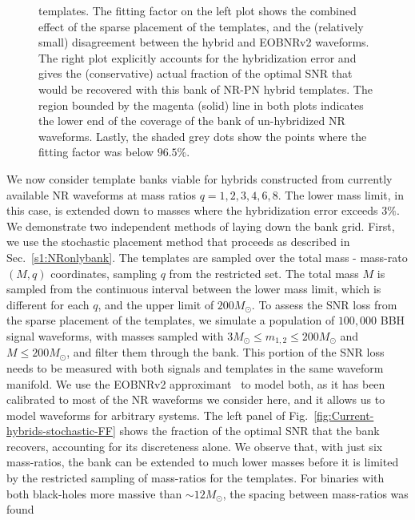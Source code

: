 \begin{figure}
\begin{center}
{  templates. The fitting factor on the left plot shows the combined effect of 
  the sparse placement of the templates, and the (relatively small) 
  disagreement between the hybrid and EOBNRv2 waveforms. The right plot
  explicitly accounts for the hybridization error and gives the (conservative)
  actual fraction of the optimal SNR that would be recovered
  with this bank of NR-PN hybrid templates. The region bounded by the magenta 
  (solid) line in both plots indicates the lower end of the coverage of the 
  bank of un-hybridized NR waveforms. Lastly, the shaded grey dots show the 
  points where the fitting factor was below $96.5\%$.  }
\end{center}
\end{figure}

We now consider template banks viable for hybrids constructed from currently 
available NR waveforms at mass ratios $q=1,2,3,4,6,8$. The lower mass limit,
in this case, is extended down to masses where the hybridization error 
exceeds $3\%$. We demonstrate two independent methods of laying
down the bank grid. First, we use the stochastic placement method that proceeds
as described in Sec.~\ref{s1:NRonlybank}. The templates are sampled over the
total mass - mass-rato $(M,q)$ coordinates, sampling $q$ from the restricted
set. The total mass $M$ is sampled from the continuous interval between the 
lower mass limit, which is different for each $q$, and the upper limit of
$200M_\odot$. To assess the SNR loss from the sparse placement
of the templates, we simulate a population of $100,000$ BBH signal waveforms,
with masses sampled with $3M_\odot\leq m_{1,2}\leq 200M_\odot$ and 
$M\leq 200M_\odot$, and filter them through the bank. This portion of the SNR
loss needs to be measured with both signals and templates in the same waveform
manifold. We use the EOBNRv2 approximant~\cite{BuonannoEOBv2Main} to model both, 
as it has been calibrated to most of the NR waveforms we consider here, and it
allows us to model waveforms for arbitrary systems. The left panel of
Fig.~\ref{fig:Current-hybrids-stochastic-FF} shows the
fraction of the optimal SNR that the bank recovers, accounting for its 
discreteness alone. We observe that, with just six mass-ratios, the bank 
can be extended to much lower masses before it is limited by the restricted
sampling of mass-ratios for the templates. For binaries with both black-holes 
more massive than $\sim 12M_\odot$, the spacing between mass-ratios was found 
